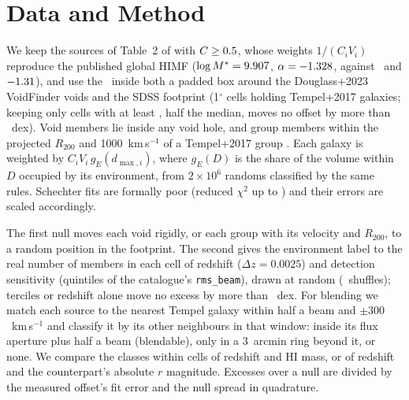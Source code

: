 \documentclass[twocolumn]{aastex631}
\newcommand{\code}[1]{\texttt{#1}}
\begin{document}
\section{Data and Method}
\label{sec:data}
We keep the sources of Table~2 of \citet{fashi_dr2} with $C\geq0.5$, whose weights
$1/(C_i V_i)$ reproduce the published global HIMF ($\log M^*=9.907$,
$\alpha=-1.328$, against \feRealDRTwoPaperLogMStar\ and $-1.31$), and use the \feRealBlendNPool\ inside both
a padded box around the Douglass+2023 VoidFinder voids \citep{douglass2023} and the SDSS footprint
(1$^\circ$ cells holding Tempel+2017 galaxies; keeping only cells with at least
\feRealStrictMinPerCell, half the median, moves no offset by more than \feRealStrictMaxShift~dex).
Void members lie inside any void hole, and group members within the projected $R_{200}$ and
1000~km\,s$^{-1}$ of a Tempel+2017 group \citep{tempel2017}. Each galaxy is weighted by
$C_i V_i\,g_E(d_{\max,i})$, where $g_E(D)$ is the share of the volume within $D$ occupied by its
environment, from $2\times10^6$ randoms classified by the same rules. Schechter fits are formally
poor (reduced $\chi^2$ up to \feRealGlobalRedChi) and their errors are scaled accordingly.

The first null moves each void rigidly, or each group with its velocity and $R_{200}$, to a
random position in the footprint. The second gives the environment label to the real number of
members in each cell of redshift ($\Delta z=0.0025$) and detection sensitivity (quintiles of the
catalogue's \code{rms\_beam}), drawn at random (\feRealShufReps\ shuffles); terciles or redshift
alone move no excess by more than \feRealShufStrataMaxDiff~dex. For blending we match each source to the nearest Tempel galaxy within half
a beam and $\pm300$~km\,s$^{-1}$ and classify it by its other neighbours in that window: inside its
flux aperture plus half a beam (blendable), only in a 3~arcmin ring beyond it, or none. We compare
the classes within cells of redshift and HI mass, or of redshift and the counterpart's absolute
$r$ magnitude. Excesses over a null are divided by the measured offset's fit error and the null
spread in quadrature.
\end{document}
